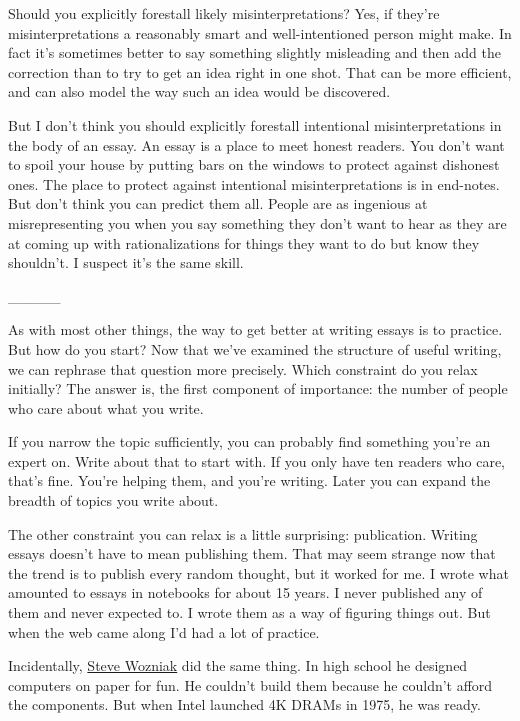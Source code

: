 \documentclass[12pt]{book}
\begin{document}
Should you explicitly forestall likely misinterpretations? Yes, if
they're misinterpretations a reasonably smart and well-intentioned
person might make. In fact it's sometimes better to say something
slightly misleading and then add the correction than to try to get an
idea right in one shot. That can be more efficient, and can also model
the way such an idea would be discovered.

But I don't think you should explicitly forestall intentional
misinterpretations in the body of an essay. An essay is a place to meet
honest readers. You don't want to spoil your house by putting bars on
the windows to protect against dishonest ones. The place to protect
against intentional misinterpretations is in end-notes. But don't think
you can predict them all. People are as ingenious at misrepresenting you
when you say something they don't want to hear as they are at coming up
with rationalizations for things they want to do but know they
shouldn't. I suspect it's the same skill.

\_\_\_\_\_

As with most other things, the way to get better at writing essays is to
practice. But how do you start? Now that we've examined the structure of
useful writing, we can rephrase that question more precisely. Which
constraint do you relax initially? The answer is, the first component of
importance: the number of people who care about what you write.

If you narrow the topic sufficiently, you can probably find something
you're an expert on. Write about that to start with. If you only have
ten readers who care, that's fine. You're helping them, and you're
writing. Later you can expand the breadth of topics you write about.

The other constraint you can relax is a little surprising: publication.
Writing essays doesn't have to mean publishing them. That may seem
strange now that the trend is to publish every random thought, but it
worked for me. I wrote what amounted to essays in notebooks for about 15
years. I never published any of them and never expected to. I wrote them
as a way of figuring things out. But when the web came along I'd had a
lot of practice.

Incidentally,
\href{http://www.foundersatwork.com/steve-wozniak.html}{Steve Wozniak}
did the same thing. In high school he designed computers on paper for
fun. He couldn't build them because he couldn't afford the components.
But when Intel launched 4K DRAMs in 1975, he was ready.
\end{document}
